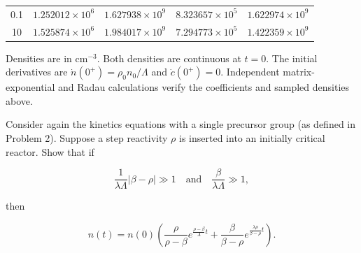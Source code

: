 \begin{adaptedsolution}
\begin{center}
\begin{tabular}{crrrr}
0.1 & $1.252012\times10^6$ & $1.627938\times10^9$ & $8.323657\times10^5$ & $1.622974\times10^9$\\
10 & $1.525874\times10^6$ & $1.984017\times10^9$ & $7.294773\times10^5$ & $1.422359\times10^9$\\
\bottomrule
\end{tabular}
\end{center}
Densities are in $\mathrm{cm^{-3}}$. Both densities are continuous at $t=0$.
The initial derivatives are $\dot n(0^+)=\rho_0 n_0/\Lambda$ and
$\dot c(0^+)=0$. Independent matrix-exponential and Radau calculations
verify the coefficients and sampled densities above.
\end{adaptedsolution}

\newpage


Consider again the kinetics equations with a single precursor group (as
defined in Problem 2). Suppose a step reactivity \(\rho\) is inserted
into an initially critical reactor. Show that if

\[
\frac{1}{\lambda\Lambda}|\beta-\rho|\gg1
\quad\text{and}\quad
\frac{\beta}{\lambda\Lambda}\gg1,
\]

then

\[
n(t)=n(0)\left(
\frac{\rho}{\rho-\beta}e^{\frac{\rho-\beta}{\Lambda}t}
+\frac{\beta}{\beta-\rho}e^{\frac{\lambda\rho}{\beta-\rho}t}
\right).
\]

